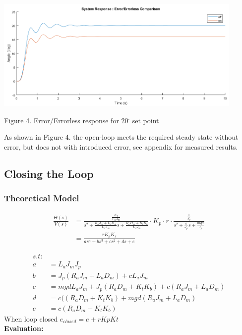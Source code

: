 \documentclass[a4paper,11pt]{article}
\begin{document}
\includegraphics[width=0.9\textwidth]{inc/openloop_response.png} 
\begin{center}
        Figure 4. Error/Errorless response for 20$^\cdot$ set point
\end{center}

As shown in Figure 4. the open-loop meets the required steady state without error, but does not with introduced error, see appendix for measured results.

\newpage
\subsection{Closing the Loop}
\subsubsection{Theoretical Model}
\begin{align*}
        \frac{\Theta(s)}{V(s)} &= \frac{\frac{K_t}{L_aJ_m}}{s^2 + \frac{R_{a}J_{m} + L_{a}D_{m}}{L_{a}J_{m}}s + \frac{R_aD_m + K_tK_b}{L_aJ_m}} \cdot K_{p} \cdot r \cdot \frac{\frac{1}{J_{p}}}{s^{2} + \frac{c}{J_{p}}s + \frac{mgd}{J_{p}}} \\
        &= \frac{rK_pK_r}{as^4+bs^3+cs^2+ds+e}
\end{align*}

\begin{align*}
s.t: \\
a &= L_aJ_mJ_p\\
b &= J_p(R_{a}J_{m} + L_{a}D_{m})+cL_aJ_m\\
c &= mgdL_aJ_m + J_p(R_aD_m + K_tK_b)+c(R_{a}J_{m} + L_{a}D_{m})\\
d &= c((R_aD_m + K_tK_b) + mgd(R_{a}J_{m} + L_{a}D_{m})\\
e &= c(R_aD_m + K_tK_b)
\end{align*}
When loop closed $e_{closed} = e + rKpKt$ \\

\textbf{Evaluation:}\\
        
\end{document}
